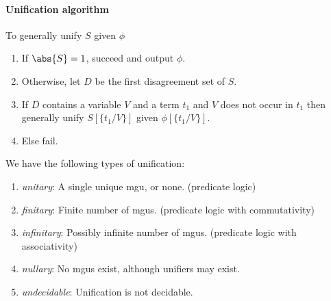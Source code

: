\documentclass{article}
\begin{document}
\paragraph{Unification algorithm}

To generally unify $S$ given $\phi$
\begin{enumerate}
	\item If $\abs{S}=1$, succeed and output $\phi$.
	\item Otherwise, let $D$ be the first disagreement set of $S$.
	\item If $D$ contains a variable $V$ and a term $t_1$ and $V$
	      does not occur in $t_1$ then generally unify $S[\{t_1/V\}]$ given $\phi[\{t_1/V\}]$.
	\item Else fail.
\end{enumerate}

\begin{definition}
	We have the following types of unification:
	\begin{enumerate}
		\item \emph{unitary}: A single unique mgu, or none. (predicate logic)
		\item \emph{finitary}: Finite number of mgus. (predicate logic with commutativity)
		\item \emph{infinitary}: Possibly infinite number of mgus. (predicate logic with associativity)
		\item \emph{nullary}: No mgus exist, although unifiers may exist.
		\item \emph{undecidable}: Unification is not decidable.
	\end{enumerate}
\end{definition}
\end{document}
